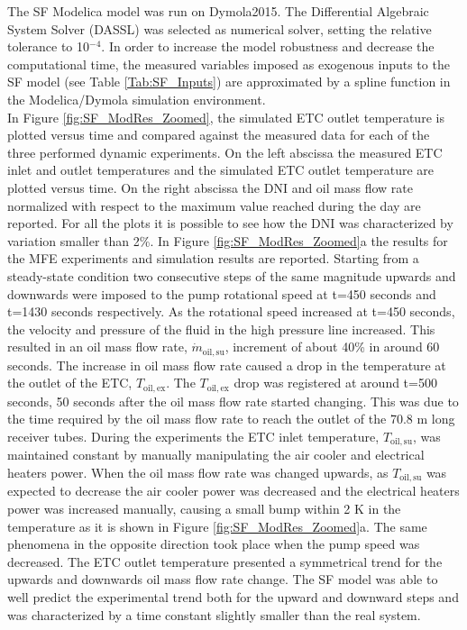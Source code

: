 \documentclass[final,3p,times,review]{elsarticle}
\begin{document}
%
The SF Modelica model was run on Dymola2015. The Differential Algebraic System Solver (DASSL) \cite{Petzold1983} was selected as numerical solver, setting the relative tolerance to 10$^{-4}$. In order to increase the model robustness and decrease the computational time, the measured variables imposed as exogenous inputs to the SF model (see Table \ref{Tab:SF_Inputs}) are approximated by a spline function in the Modelica/Dymola simulation environment.\\
In Figure \ref{fig:SF_ModRes_Zoomed}, the simulated ETC outlet temperature is plotted versus time and compared against the measured data for each of the three performed dynamic experiments. On the left abscissa the measured ETC inlet and outlet temperatures and the simulated ETC outlet temperature are plotted versus time. On the right abscissa the DNI and oil mass flow rate normalized with respect to the maximum value reached during the day are reported. For all the plots it is possible to see how the DNI was characterized by variation smaller than 2\%. In Figure \ref{fig:SF_ModRes_Zoomed}a the results for the MFE experiments and simulation results are reported. Starting from a steady-state condition two consecutive steps of the same magnitude upwards and downwards were imposed to the pump rotational speed at t=450 seconds and t=1430 seconds respectively. As the rotational speed increased at t=450 seconds, the velocity and pressure of the fluid in the high pressure line increased. This resulted in an oil mass flow rate, $\dot{m}_\mathrm{oil,su}$, increment of about 40\% in around 60 seconds. The increase in oil mass flow rate caused a drop in the temperature at the outlet of the ETC, $T_\mathrm{oil,ex}$. The $T_\mathrm{oil,ex}$ drop was registered at around t=500 seconds, 50 seconds after the oil mass flow rate started changing. This was due to the time required by the oil mass flow rate to reach the outlet of the 70.8 m long receiver tubes. During the experiments the ETC inlet temperature, $T_\mathrm{oil,su}$, was maintained constant  by manually manipulating the air cooler and electrical heaters power. 
When the oil mass flow rate was changed upwards, as $T_\mathrm{oil,su}$ was expected to decrease the air cooler power was 
decreased and the electrical heaters power was increased manually, causing a small bump within 2 K in the temperature as it is shown in Figure \ref{fig:SF_ModRes_Zoomed}a.  
The same phenomena in the opposite direction took place when the pump speed was decreased. 
The ETC outlet temperature presented a symmetrical trend for the upwards and downwards oil mass flow rate change. The SF model was able to well predict the experimental trend both for the upward and downward steps and was characterized by a time constant slightly smaller than the real system.\\
\end{document}
